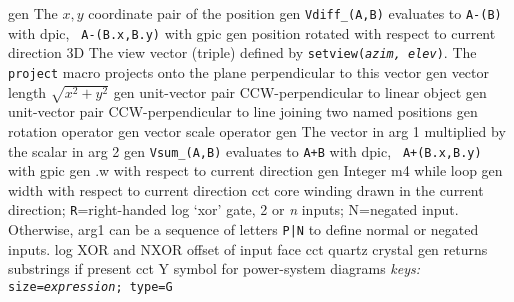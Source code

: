   {gen}
  {The $x, y$ coordinate pair of the position}
  {gen}
  {{\tt Vdiff\_(A,B)} evaluates to {\tt A-(B)} with dpic, {\tt
  A-(B.x,B.y)}
   with gpic}
  {gen}
  {position rotated with respect to current direction}
  {3D} {The view vector (triple) defined by {\tt setview({\sl azim,
  elev})}. The
   {\tt project} macro projects onto the plane perpendicular to this
   vector}
  {gen}
  {vector length $\sqrt{x^2+y^2}$}
  {gen}
  {unit-vector pair CCW-perpendicular to linear object}
  {gen}
  {unit-vector pair CCW-perpendicular to line joining two named
  positions}
  {gen}
  {rotation operator}
  {gen}
  {vector scale operator}
  {gen}
  {The vector in arg 1 multiplied by the scalar in arg 2}
  {gen}
  {{\tt Vsum\_(A,B)} evaluates to {\tt A+B} with dpic, {\tt
  A+(B.x,B.y)}
   with gpic}
%
  {gen}
  {.w with respect to current direction}
  {gen}
  {Integer m4 while loop}
  {gen}
  {width with respect to current direction}
  {cct}
  {core winding drawn in the current direction; {\tt R}=right-handed
   }
  {log}
  {`xor' gate, 2 or {\sl n\/} inputs; N=negated input.
   Otherwise, arg1 can be a sequence of letters {\tt P|N} to define
   normal or negated inputs.
    }
  {log}
  {XOR and NXOR offset of input face}
%
  {cct}
  {quartz crystal}
  {gen}
  {returns substrings if present}
%
  {cct}
  {Y symbol for power-system diagrams
   {\sl keys:} {\tt size={\sl expression}; type=G}}
